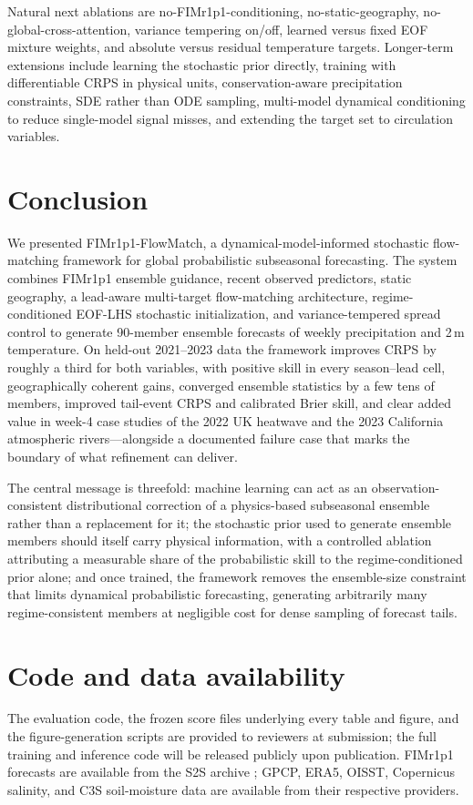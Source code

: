 \documentclass[11pt]{article}
\newcommand{\modelshort}{FIMr1p1}
\newcommand{\methodname}{\modelshort{}-FlowMatch}
\begin{document}
Natural next ablations are no-\modelshort{}-conditioning, no-static-geography, no-global-cross-attention, variance tempering on/off, learned versus fixed EOF mixture weights, and absolute versus residual temperature targets. Longer-term extensions include learning the stochastic prior directly, training with differentiable CRPS in physical units, conservation-aware precipitation constraints, SDE rather than ODE sampling, multi-model dynamical conditioning to reduce single-model signal misses, and extending the target set to circulation variables.

\section{Conclusion}
\label{sec:conclusion}

We presented \methodname{}, a dynamical-model-informed stochastic flow-matching framework for global probabilistic subseasonal forecasting. The system combines \modelshort{} ensemble guidance, recent observed predictors, static geography, a lead-aware multi-target flow-matching architecture, regime-conditioned EOF-LHS stochastic initialization, and variance-tempered spread control to generate 90-member ensemble forecasts of weekly precipitation and 2\,m temperature. On held-out 2021--2023 data the framework improves CRPS by roughly a third for both variables, with positive skill in every season--lead cell, geographically coherent gains, converged ensemble statistics by a few tens of members, improved tail-event CRPS and calibrated Brier skill, and clear added value in week-4 case studies of the 2022 UK heatwave and the 2023 California atmospheric rivers---alongside a documented failure case that marks the boundary of what refinement can deliver.

The central message is threefold: machine learning can act as an observation-consistent distributional correction of a physics-based subseasonal ensemble rather than a replacement for it; the stochastic prior used to generate ensemble members should itself carry physical information, with a controlled ablation attributing a measurable share of the probabilistic skill to the regime-conditioned prior alone; and once trained, the framework removes the ensemble-size constraint that limits dynamical probabilistic forecasting, generating arbitrarily many regime-consistent members at negligible cost for dense sampling of forecast tails.

\section*{Code and data availability}

The evaluation code, the frozen score files underlying every table and figure, and the figure-generation scripts are provided to reviewers at submission; the full training and inference code will be released publicly upon publication. \modelshort{} forecasts are available from the S2S archive \citep{Vitart2017}; GPCP, ERA5, OISST, Copernicus salinity, and C3S soil-moisture data are available from their respective providers.



\end{document}
